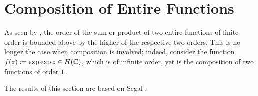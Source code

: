 \chapter{Composition of Entire Functions}
\label{ch:composition-entire-functions}

As seen by , the order of the sum or product of two entire functions of finite order is bounded above by the higher of the respective two orders. This is no longer the case when composition is involved; indeed, consider the function $f(z) \coloneqq \exp \exp z \in H(\mathbb{C})$, which is of infinite order, yet is the composition of two functions of order $1$. 

The results of this section are based on Segal \cite{segal-complex-analysis}.

